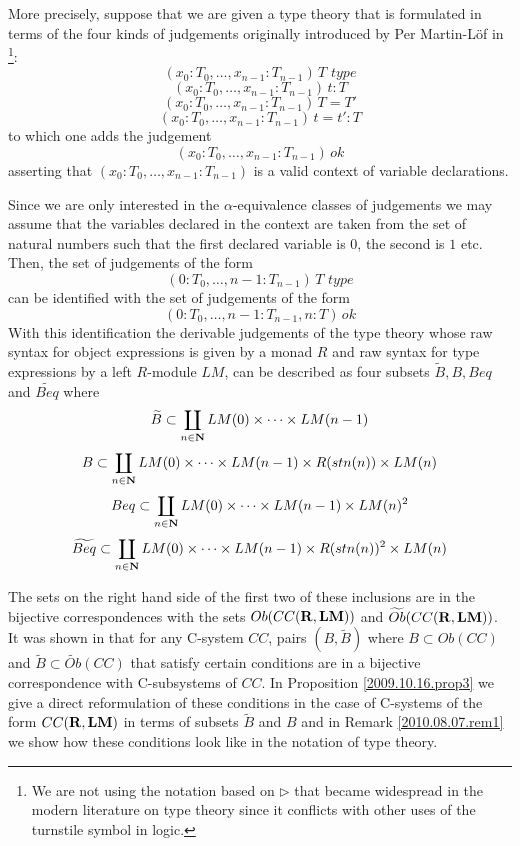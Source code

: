 \documentclass[11pt]{article}
\newcommand{\nn}{{\bf N\rm}}
\newcommand{\nat}{\nn}
\newcommand{\rr}{{\bf R}}
\newcommand{\lm}{{\bf LM}}
\newcommand{\wt}{\widetilde}
\begin{document}
More precisely, suppose that we are given a type theory that is formulated in terms of the four kinds of judgements originally introduced by Per Martin-L\"{o}f in \cite[p.161]{MLTT79}\footnote{We are not using the notation based on $\rhd$ that became widespread in the modern literature on type theory since it conflicts with other uses of the turnstile symbol in logic.}:
%
$$(x_0:T_0,\dots,x_{n-1}:T_{n-1})\,T\,\,type$$
$$(x_0:T_0,\dots,x_{n-1}:T_{n-1})\,t:T$$
$$(x_0:T_0,\dots,x_{n-1}:T_{n-1})\,T=T'$$
$$(x_0:T_0,\dots,x_{n-1}:T_{n-1})\,t=t':T$$
%
to which one adds the judgement
%
$$(x_0:T_0,\dots,x_{n-1}:T_{n-1})\,ok$$
%
asserting that $(x_0:T_0,\dots,x_{n-1}:T_{n-1})$ is a valid context of variable declarations.

Since we are only interested in the $\alpha$-equivalence classes of judgements we may assume that the variables declared in the context are taken from the set of natural numbers such that the first declared variable is $0$, the second is $1$ etc.  Then, the set of judgements of the form 
%
$$(0:T_0,\dots,{n-1}:T_{n-1})\,T\,\,type$$
%
can be identified with the set of judgements of the form 
%
$$(0:T_0,\dots,{n-1}:T_{n-1}, n:T)\,ok$$
%
With this identification the derivable judgements of the type theory whose raw syntax for object expressions is given by a monad $R$ and raw syntax for type expressions by a left $R$-module $LM$, can be described as four subsets ${\wt{B}},{B},{Beq}$ and ${\wt{Beq}}$ where 
%
$${\wt{B}} \subset \coprod_{n\in\nat} LM(0)\times\dots\times LM(n-1)$$
$${B}\subset  \coprod_{n\in\nat} LM(0)\times\dots\times LM(n-1)\times R({stn(n)})\times LM(n)$$
$${Beq} \subset \coprod_{n\in\nat} LM(0)\times\dots\times LM(n-1)\times LM(n)^2$$
$${\wt{Beq}} \subset \coprod_{n\in\nat} LM(0)\times\dots\times LM(n-1)\times R({stn(n)})^2\times LM(n)$$ 
%

The sets on the right hand side of the first two of these inclusions are in the bijective correspondences with the sets $Ob(CC(\rr,\lm))$ and $\wt{Ob}(CC(\rr,\lm))$. It was shown in \cite[Proposition 4.3]{Csubsystems} that for any C-system $CC$, pairs $(B,\wt{B})$ where $B\subset Ob(CC)$ and $\wt{B}\subset \wt{Ob}(CC)$ that satisfy certain conditions are in a bijective correspondence with C-subsystems of $CC$. In Proposition \ref{2009.10.16.prop3} we give a direct reformulation of these conditions in the case of C-systems of the form $CC(\rr,\lm)$ in terms of subsets ${\wt{B}}$ and ${B}$ and in Remark \ref{2010.08.07.rem1} we show how these conditions look like in the notation of type theory. 
\end{document}
